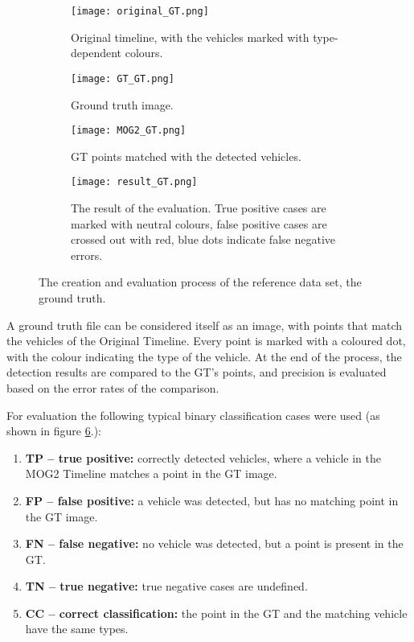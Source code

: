 \begin{figure}[!h]
	\centering
	\begin{subfigure}[!h]{0.9\textwidth}
		\texttt{[image: original\_GT.png]}
		\caption{Original timeline, with the vehicles marked with type-dependent colours.\label{fig:GT_original}}
	\end{subfigure}
	\hfill
	\begin{subfigure}[!h]{0.9\textwidth}
		\texttt{[image: GT\_GT.png]}
		\caption{Ground truth image.\label{fig:GT_GT}}
	\end{subfigure}
	\hfill
	\begin{subfigure}[!h]{0.9\textwidth}
		\texttt{[image: MOG2\_GT.png]}
		\caption{GT points matched with the detected vehicles. \label{fig:GT_MOG}}
	\end{subfigure}
	\hfill
	\begin{subfigure}[!h]{0.9\textwidth}
		\texttt{[image: result\_GT.png]}
		\caption{The result of the evaluation. True positive cases are marked with neutral colours, false positive cases are crossed out with red, blue dots indicate false negative errors.\label{fig:GT_result}}
	\end{subfigure}
	\caption{The creation and evaluation process of the reference data set, the ground truth.\label{fig:GT}}
\end{figure}

A ground truth file can be considered itself as an image, with points that match the vehicles of the Original Timeline.
Every point is marked with a coloured dot, with the colour indicating the type of the vehicle.
At the end of the process, the detection results are compared to the GT's  points, and precision is evaluated based on the error rates of the comparison.

\begin{figure}[!h]
	\centering
	
	\caption{ \label{fig:error_cases}}
\end{figure}

For evaluation the following typical binary classification cases were used (as shown in figure \ref{fig:error_cases}.):
\begin{enumerate}
\item \textbf{TP -- true positive:} correctly detected vehicles, where a vehicle in the MOG2 Timeline matches a point in the GT image.
\item \textbf{FP -- false positive:} a vehicle was detected, but has no matching point in the GT image.
\item \textbf{FN -- false negative:} no vehicle was detected, but a point is present in the GT. 
\item \textbf{TN -- true negative:} true negative cases are undefined.
\item  \textbf{CC -- correct classification:} the point in the GT and the matching vehicle have the same types.
\end{enumerate}

